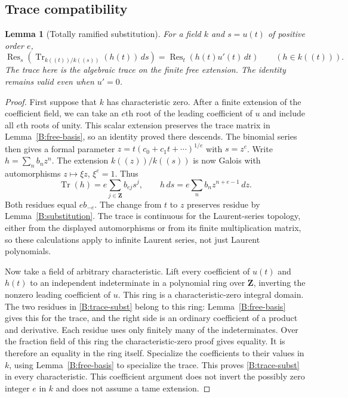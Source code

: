 \documentclass[11pt]{amsart}
\newtheorem{lemma}[theorem]{Lemma}
\theoremstyle{definition}
\theoremstyle{remark}
\newcommand{\Tr}{\operatorname{Tr}}
\newcommand{\Res}{\operatorname{Res}}
\begin{document}
\subsection{Trace compatibility}
\begin{lemma}[Totally ramified substitution]\label{B:trace-substitution}
For a field $k$ and $s=u(t)$ of positive order $e$,
\begin{equation}\label{B:trace-subst}
 \Res_s\left(\Tr_{k((t))/k((s))}(h(t))\,ds\right)
       =\Res_t\left(h(t)u'(t)\,dt\right)
                 \qquad(h\in k((t))).
\end{equation}
The trace here is the algebraic trace on the finite free extension.
The identity remains valid even when $u'=0$.
\end{lemma}
\begin{proof}
First suppose that $k$ has characteristic zero. After a finite extension
of the coefficient field, we can take an $e$th root of the leading
coefficient of $u$ and include all $e$th roots of unity. This scalar
extension preserves the trace matrix in Lemma~\ref{B:free-basis}, so an
identity proved there descends. The binomial series then gives a formal
parameter $z=t(c_0+c_1t+\cdots)^{1/e}$ with $s=z^e$.
Write $h=\sum_n b_nz^n$. The extension $k((z))/k((s))$ is now
Galois with automorphisms $z\mapsto\xi z$, $\xi^e=1$. Thus
\[
 \Tr(h)=e\sum_{j\in\mathbf Z}b_{ej}s^j,
 \qquad h\,ds=e\sum_n b_nz^{n+e-1}\,dz.
\]
Both residues equal $e b_{-e}$. The change from $t$ to $z$ preserves
residue by Lemma~\ref{B:substitution}. The trace is continuous for the
Laurent-series topology, either from the displayed automorphisms or
from its finite multiplication matrix, so these calculations apply to
infinite Laurent series, not just Laurent polynomials.

Now take a field of arbitrary characteristic. Lift every coefficient
of $u(t)$ and $h(t)$ to an independent indeterminate in a polynomial
ring over $\mathbf Z$, inverting the nonzero leading coefficient of
$u$. This ring is a characteristic-zero integral domain. The two
residues in \eqref{B:trace-subst} belong to this ring:
Lemma~\ref{B:free-basis} gives this for the trace, and the right side
is an ordinary coefficient of a product and derivative. Each residue
uses only finitely many of the indeterminates. Over the fraction field
of this ring the characteristic-zero proof gives equality. It is
therefore an equality in the ring itself. Specialize the coefficients
to their values in $k$, using Lemma~\ref{B:free-basis} to specialize
the trace. This proves \eqref{B:trace-subst} in every characteristic.
This coefficient argument does not invert the possibly zero integer
$e$ in $k$ and does not assume a tame extension.
\end{proof}
\end{document}
